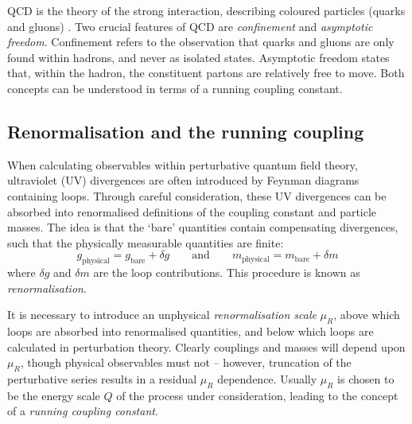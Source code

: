 
\ac{QCD} is the theory of the strong interaction, describing coloured particles (quarks 
and gluons) \cite{Ellis:1996}. Two crucial features of \ac{QCD} are \textit{confinement} 
and \textit{asymptotic freedom}. Confinement refers to the observation that quarks and 
gluons are only found within hadrons, and never as isolated states. Asymptotic freedom 
states that, within the hadron, the constituent partons are relatively free to move. Both 
concepts can be understood in terms of a running coupling constant.



\subsection{Renormalisation and the running coupling}
\label{sec:qcd:renormalisation}

When calculating observables within perturbative quantum field theory, ultraviolet (UV) 
divergences are often introduced by Feynman diagrams containing loops. Through careful 
consideration, these UV divergences can be absorbed into renormalised definitions of the 
coupling constant and particle masses. The idea is that the `bare' quantities contain 
compensating divergences, such that the physically measurable quantities are finite:
\begin{equation}
	g_{\text{physical}} = g_{\text{bare}} + \delta g
	\quad\quad\text{and}\quad\quad
	m_{\text{physical}} = m_{\text{bare}} + \delta m
\end{equation}
where $\delta g$ and $\delta m$ are the loop contributions. This procedure is known as 
\textit{renormalisation}.

It is necessary to introduce an unphysical \textit{renormalisation scale} $\mu_R$, above 
which loops are absorbed into renormalised quantities, and below which loops are 
calculated in perturbation theory. Clearly couplings and masses will depend upon $\mu_R$,
though physical observables must not -- however, truncation of the perturbative series 
results in a residual $\mu_R$ dependence. Usually $\mu_R$ is chosen to be the energy 
scale $Q$ of the process under consideration, leading to the concept of a \textit{running 
coupling constant}.


